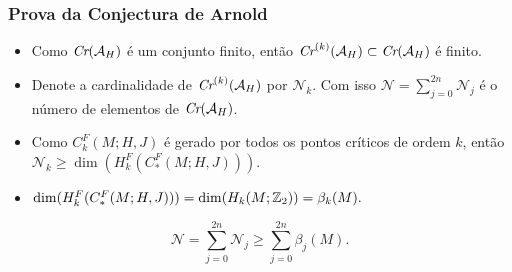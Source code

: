 \documentclass{beamer}
\begin{document}
\begin{footnotesize}
	
	\begin{frame}
		\frametitle{Prova da Conjectura de Arnold}
			
			\begin{prova}
				\begin{itemize}
					\item Como $\textit{Cr}(\mathcal{A}_{H})$ é um conjunto finito, então $\textit{Cr}^{(k)}(\mathcal{A}_{H}) \subset \textit{Cr}(\mathcal{A}_{H})$ é finito.
					
					\item Denote a cardinalidade de $\textit{Cr}^{(k)}(\mathcal{A}_{H})$ por $\mathcal{N}_{k}$. Com isso $\mathcal{N} =\sum_{j=0}^{2n} \mathcal{N}_{j}$ é o número de elementos de $\textit{Cr}(\mathcal{A}_{H})$.
					
					\item  Como $C^{F}_{k}(M;H,J)$ é gerado por todos os pontos críticos de ordem $k$, então $\mathcal{N}_{k}\geq \dim(	H^{F}_{k}(C^{F}_{*}(M;H,J)))$. 
					
					\item $\dim(	H^{F}_{k}(C^{F}_{*}(M;H,J)))  = \dim(	H_{k}(M;\mathbb{Z}_{2})) = \beta_{k}(M).$
				\end{itemize} 
				$$
				\mathcal{N} =\sum_{j=0}^{2n} \mathcal{N}_{j} \geq \sum_{j=0}^{2n} \beta_{j}(M).
				$$
				
			\end{prova}
			
	\end{frame}

\end{footnotesize}	
\end{document}
